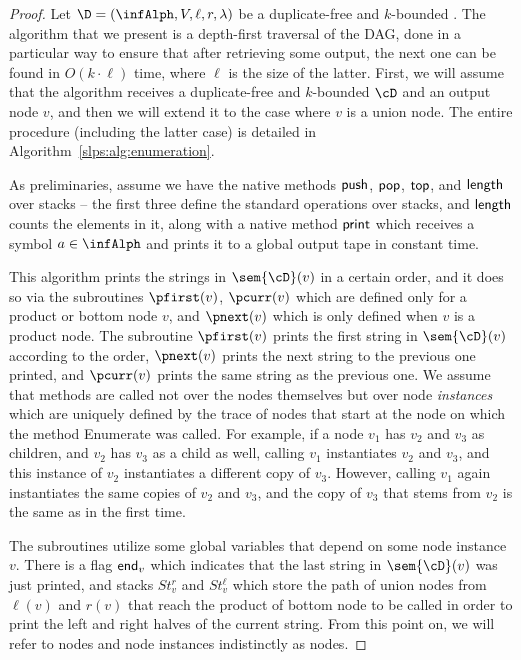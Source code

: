
\newcommand{\len}{\mathsf{len}}
\newcommand{\shift}{\mathsf{HEYHEYHEY}}

\begin{proof}
Let $\D = (\infAlph, V, \ell, r, \lambda)$ be a duplicate-free and $k$-bounded \dsabbr{}.
The algorithm that we present is a depth-first traversal of the DAG, done in a particular way to ensure that after retrieving some output, the next one can be found in $O(k\cdot \ell)$ time, where $\ell$ is the size of the latter. First, we will assume that the algorithm receives a duplicate-free and $k$-bounded $\cD$ and an output node $v$, and then we will extend it to the case where $v$ is a union node. The entire procedure (including the latter case) is detailed in Algorithm~\ref{slps:alg:enumeration}.



As preliminaries, assume we have the native methods $\text{\sf push}$, $\text{\sf pop}$, $\text{\sf top}$, and $\text{\sf length}$ over stacks -- the first three define the standard operations over stacks, and $\text{\sf length}$ counts the elements in it, along with a native method $\text{\sf print}$ which receives a symbol $a\in\infAlph$ and prints it to a global output tape in constant time.

This algorithm prints the strings in $\sem{\cD}(v)$ in a certain order, and it does so via the subroutines $\pfirst(v)$, $\pcurr(v)$ which are defined only for a product or bottom node $v$, and $\pnext(v)$ which is only defined when $v$ is a product node.
The subroutine $\pfirst(v)$ prints the first string in $\sem{\cD}(v)$ according to the order, $\pnext(v)$ prints the next string to the previous one printed, and $\pcurr(v)$ prints the same string as the previous one. We assume that methods are called not over the nodes themselves but over node {\it instances} which are uniquely defined by the trace of nodes that start at the node on which the method {\sc Enumerate} was called. For example, if a node $v_1$ has $v_2$ and $v_3$ as children, and $v_2$ has $v_3$ as a child as well, calling $v_1$ instantiates $v_2$ and $v_3$, and this instance of $v_2$ instantiates a different copy of $v_3$. However, calling $v_1$ again instantiates the same copies of $v_2$ and $v_3$, and the copy of $v_3$ that stems from $v_2$ is the same as in the first time.

The subroutines utilize some global variables that depend on some node instance $v$. There is a flag $\text{\sf end}_v$ which indicates that the last string in $\sem{\cD}(v)$ was just printed, and stacks $St^{r}_v$ and $St^{\ell}_v$ which store the path of union nodes from $\ell(v)$ and $r(v)$ that reach the product of bottom node to be called in order to print the left and right halves of the current string. From this point on, we will refer to nodes and node instances  indistinctly as nodes.


\end{proof}
